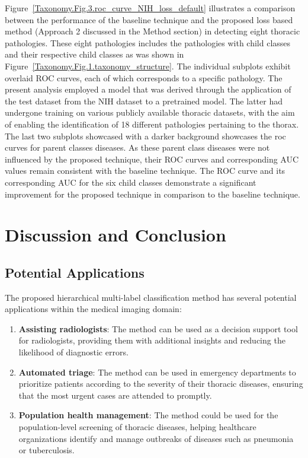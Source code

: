 \documentclass[preprint,3p,times, review]{elsarticle}
\begin{document}
Figure~\ref{Taxonomy.Fig.3.roc_curve_NIH_loss_default} illustrates a comparison between the performance of the baseline technique and the proposed loss based method (Approach 2 discussed in the Method section) in detecting eight thoracic pathologies. These eight pathologies includes the pathologies with child classes and their respective child classes as was shown in Figure~\ref{Taxonomy.Fig.1.taxonomy_structure}. The individual subplots exhibit overlaid ROC curves, each of which corresponds to a specific pathology. The present analysis employed a model that was derived through the application of the test dataset from the NIH dataset to a pretrained model. The latter had undergone training on various publicly available thoracic datasets, with the aim of enabling the identification of 18 different pathologies pertaining to the thorax. The last two subplots showcased with a darker background showcases the roc curves for parent classes diseases. As these parent class diseases were not influenced by the proposed technique, their ROC curves and corresponding AUC values remain consistent with the baseline technique. The ROC curve and its corresponding AUC for the six child classes demonstrate a significant improvement for the proposed technique in comparison to the baseline technique.


\section{Discussion and Conclusion}




\subsection{Potential Applications}

    The proposed hierarchical multi-label classification method has several potential applications within the medical imaging domain:

    \begin{enumerate}
        \item \textbf{Assisting radiologists}: The method can be used as a decision support tool for radiologists, providing them with additional insights and reducing the likelihood of diagnostic errors.

        \item \textbf{Automated triage}: The method can be used in emergency departments to prioritize patients according to the severity of their thoracic diseases, ensuring that the most urgent cases are attended to promptly.

        \item \textbf{Population health management}: The method could be used for the population-level screening of thoracic diseases, helping healthcare organizations identify and manage outbreaks of diseases such as pneumonia or tuberculosis.
    \end{enumerate}
\end{document}
